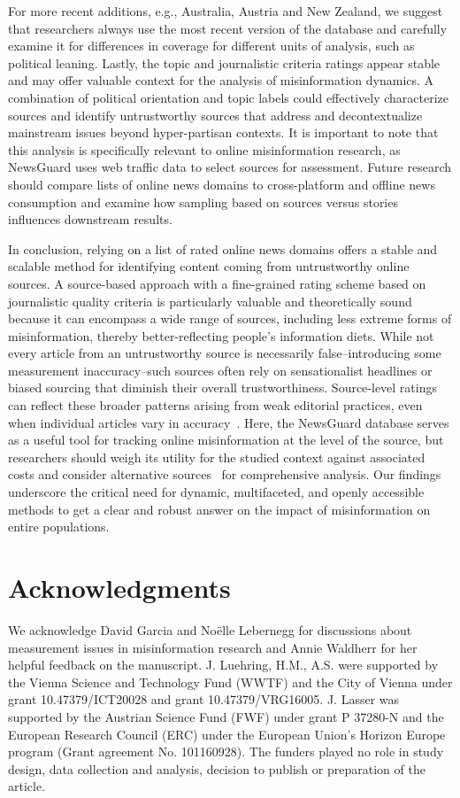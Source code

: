 \documentclass[12pt,twoside]{article}
\begin{document}
For more recent additions, e.g., Australia, Austria and New Zealand, we suggest that researchers always use the most recent version of the database and carefully examine it for differences in coverage for different units of analysis, such as political leaning. 
Lastly, the topic and journalistic criteria ratings appear stable and may offer valuable context for the analysis of misinformation dynamics.
A combination of political orientation and topic labels could effectively characterize sources and identify untrustworthy sources that address and decontextualize mainstream issues beyond hyper-partisan contexts.
It is important to note that this analysis is specifically relevant to online misinformation research, as NewsGuard uses web traffic data to select sources for assessment. 
Future research should compare lists of online news domains to cross-platform and offline news consumption and examine how sampling based on sources versus stories influences downstream results. 

In conclusion, relying on a list of rated online news domains offers a stable and scalable method for identifying content coming from untrustworthy online sources.
A source-based approach with a fine-grained rating scheme based on journalistic quality criteria is particularly valuable and theoretically sound because it can encompass a wide range of sources, including less extreme forms of misinformation, thereby better-reflecting people's information diets. 
While not every article from an untrustworthy source is necessarily false--introducing some measurement inaccuracy--such sources often rely on sensationalist headlines or biased sourcing that diminish their overall trustworthiness. 
Source-level ratings can reflect these broader patterns arising from weak editorial practices, even when individual articles vary in accuracy~\citep{lazerScienceFakeNews2018}.
Here, the NewsGuard database serves as a useful tool for tracking online misinformation at the level of the source, but researchers should weigh its utility for the studied context against associated costs and consider alternative sources~\citep[e.g.,][]{linHighLevelCorrespondence2023a} for comprehensive analysis. 
Our findings underscore the critical need for dynamic, multifaceted, and openly accessible methods to get a clear and robust answer on the impact of misinformation on entire populations.

\section{Acknowledgments}
We acknowledge David Garcia and Noëlle Lebernegg for discussions about measurement issues in misinformation research and Annie Waldherr for her helpful feedback on the manuscript.
J. Luehring, H.M., A.S. were supported by the Vienna Science and Technology Fund (WWTF) and the City of Vienna under grant 10.47379/ICT20028 and grant 10.47379/VRG16005.  
J. Lasser was supported by the Austrian Science Fund (FWF) under grant P 37280-N and the European Research Council (ERC) under the European Union’s Horizon Europe program (Grant agreement No. 101160928).
The funders played no role in study design, data collection and analysis, decision to publish or preparation of the article.
\end{document}
